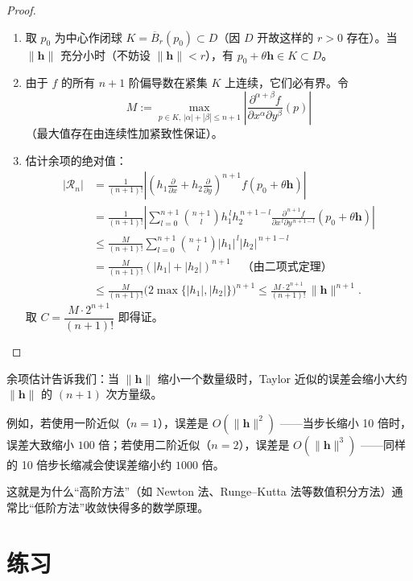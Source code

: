 \documentclass[lang=cn,11pt]{elegantbook}
\begin{document}
\begin{proof}
\begin{enumerate}
  \item 取 $p_0$ 为中心作闭球 $K=\overline{B}_r(p_0)\subset D$（因 $D$ 开故这样的 $r>0$ 存在）。当 $\|\boldsymbol h\|$ 充分小时（不妨设 $\|\boldsymbol h\|<r$），有 $p_0+\theta\boldsymbol h\in K\subset D$。
  \item 由于 $f$ 的所有 $n+1$ 阶偏导数在紧集 $K$ 上连续，它们必有界。令
  \[
  M:=\max\limits_{p\in K,\,|\alpha|+|\beta|\leq n+1} \left|\frac{\partial^{\alpha+\beta}f}{\partial x^{\alpha}\partial y^{\beta}}(p)\right|
  \]
  （最大值存在由连续性加紧致性保证）。
  \item 估计余项的绝对值：
  \begin{align*}
  |\mathcal R_n| &= \frac{1}{(n+1)!} \left| \left(h_1\frac{\partial}{\partial x}+h_2\frac{\partial}{\partial y}\right)^{\!n+1} f(p_0+\theta\boldsymbol h) \right| \\[6pt]
  &= \frac{1}{(n+1)!} \left| \sum_{l=0}^{n+1}\binom{n+1}{l}h_1^{\,l}h_2^{\,n+1-l} \frac{\partial^{\,n+1}f}{\partial x^{\,l}\partial y^{\,n+1-l}} (p_0+\theta\boldsymbol h) \right| \\[6pt]
  &\leq \frac{M}{(n+1)!} \sum_{l=0}^{n+1}\binom{n+1}{l}|h_1|^{\,l}|h_2|^{\,n+1-l} \\[6pt]
  &= \frac{M}{(n+1)!}(|h_1|+|h_2|)^{n+1} \quad\text{（由二项式定理）} \\[6pt]
  &\leq \frac{M}{(n+1)!}\bigl(2\max\{|h_1|,|h_2|\}\bigr)^{n+1} \leq \frac{M\cdot 2^{n+1}}{(n+1)!}\,\|\boldsymbol h\|^{n+1}.
  \end{align*}
  取 $C=\dfrac{M\cdot 2^{n+1}}{(n+1)!}$ 即得证。
\end{enumerate}
\end{proof}

\begin{note}[实用意义]
余项估计告诉我们：当 $\|\boldsymbol h\|$ 缩小一个数量级时，Taylor 近似的误差会缩小大约 $\|\boldsymbol h\|$ 的 $(n+1)$ 次方量级。

例如，若使用一阶近似（$n=1$），误差是 $O(\|\boldsymbol h\|^2)$ ——当步长缩小 10 倍时，误差大致缩小 $100$ 倍；若使用二阶近似（$n=2$），误差是 $O(\|\boldsymbol h\|^3)$ ——同样的 10 倍步长缩减会使误差缩小约 $1000$ 倍。

这就是为什么“高阶方法”（如 Newton 法、Runge--Kutta 法等数值积分方法）通常比“低阶方法”收敛快得多的数学原理。
\end{note}



\section{练习}
\end{document}
